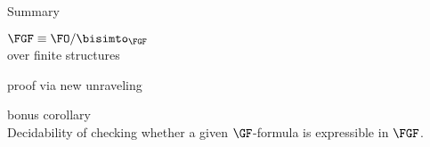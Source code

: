 \documentclass[aspectratio=169]{beamer}
\begin{document}
\begin{frame}{Summary}
  \begin{center}
    \huge $\FGF \equiv \FO/{\bisimto_{\FGF}}$ \\[0.5ex]
    \large over finite structures
  \end{center}

  \begin{center}
  \begin{minipage}[t]{0.4\textwidth}
    \raggedleft

    { proof via new unraveling} \\
    
  \end{minipage}
  \hspace{4em}
  \begin{minipage}[t]{0.4\textwidth}
    \raggedright

    { bonus corollary} \\[1ex]
    Decidability of checking whether a given $\GF$-formula is expressible in $\FGF$.
  \end{minipage}
\end{center}
\end{frame}
\end{document}
